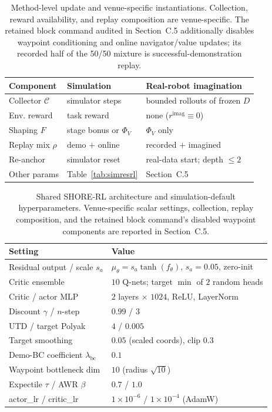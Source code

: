 \documentclass[letterpaper]{article} %
\begin{document}
\begin{table}[t]
\centering\small\setlength{\tabcolsep}{3pt}
\begin{tabular}{@{}p{}p{}p{}@{}}
\toprule
Component & Simulation & Real-robot imagination \\
\midrule
Collector $\mathcal C$ & simulator steps & bounded rollouts of frozen $D$ \\
Env. reward & task reward & none ($r^{\mathrm{imag}}\equiv0$) \\
Shaping $F$ & stage bonus or $\Phi_V$ & $\Phi_V$ only \\
Replay mix $\rho$ & demo $+$ online & recorded $+$ imagined \\
Re-anchor & simulator reset & real-data start; depth $\leq2$ \\
Other params & Table~\ref{tab:simresrl} & Section~C.5 \\
\bottomrule
\end{tabular}
\caption{Method-level update and venue-specific instantiations. Collection,
reward availability, and replay composition are venue-specific. The retained
block command audited in Section~C.5 additionally disables waypoint
conditioning and online navigator/value updates; its recorded half of the 50/50
mixture is successful-demonstration replay.}
\label{tab:venueinst}
\end{table}

\begin{table}[t]
\centering\small\setlength{\tabcolsep}{4pt}
\begin{tabular}{@{}p{}p{}@{}}
\toprule
Setting & Value \\
\midrule
Residual output / scale $s_a$   & $\mu_\theta=s_a\tanh(f_\theta)$, $s_a=0.05$, zero-init \\
Critic ensemble                 & $10$ Q-nets; target $\min$ of $2$ random heads \\
Critic / actor MLP              & $2$ layers $\times$ $1024$, ReLU, LayerNorm \\
Discount $\gamma$ / $n$-step    & $0.99$ / $3$ \\
UTD / target Polyak             & $4$ / $0.005$ \\
Target smoothing                & $0.05$ (scaled coords), clip $0.3$ \\
Demo-BC coefficient $\lambda_{\mathrm{bc}}$ & $0.1$ \\
Waypoint bottleneck dim         & $10$ (radius $\sqrt{10}$) \\
Expectile $\tau$ / AWR $\beta$  & $0.7$ / $1.0$ \\
actor\_lr / critic\_lr          & $1{\times}10^{-6}$ / $1{\times}10^{-4}$ (AdamW) \\
\bottomrule
\end{tabular}
\caption{Shared SHORE-RL architecture and simulation-default hyperparameters.
Venue-specific scalar settings, collection, replay composition, and the
retained block command's disabled waypoint components are reported in
Section~C.5.}
\label{tab:sharedhp}
\end{table}
\end{document}
